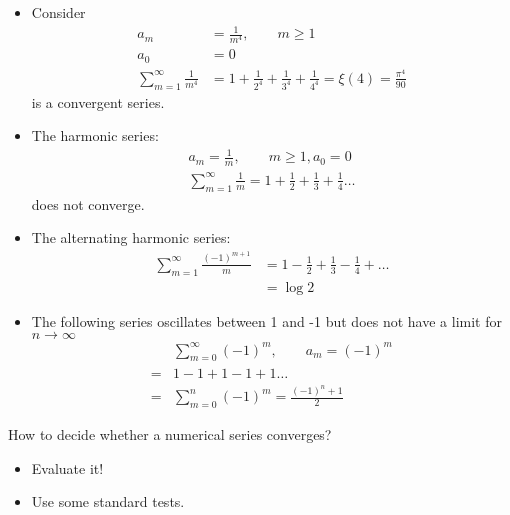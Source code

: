 \begin{ex}
	\begin{itemize}
		\item
		Consider
		\begin{align*}
		a_m & = \frac 1 {m^4}, \qquad m \ge 1 \\
		a_0 & = 0 \\
		\sum_{m=1}^\infty \frac 1 {m^4} & = 1 + \frac 1 {2^4} + \frac 1 {3^4} + \frac 1 {4^4} = \xi(4) = \frac{\pi^4}{90}
		\end{align*}
		is a convergent series.
		\item The harmonic series:
		\begin{align*}
		a_m = \frac 1 m, \qquad m \ge 1, a_0 = 0 \\
		\sum_{m=1}^\infty \frac 1 m = 1 + \frac 1 2 + \frac 1 3 + \frac 1 4 \dots
		\end{align*}
		does not converge. 
		\item The alternating harmonic series:
		\begin{align*}
		\sum_{m=1}^\infty \frac{(-1)^{m+1}}{m} & = 1 - \frac 1 2 + \frac 1 3 - \frac 1 4 + \dots \\
		& = \log 2
		\end{align*}
		\item
		The following series oscillates between 1 and -1 but does not have a limit for $n \to \infty$
		\begin{align*} 
		& \sum_{m=0}^\infty (-1)^m, \qquad a_m = (-1)^m \\
		= & 1 -1 +1 -1 +1 \dots \\
		= & \sum_{m=0}^n (-1)^m = \frac{(-1)^n+1}{2} 
		\end{align*}
	\end{itemize}
\end{ex}

How to decide whether a numerical series converges?
\begin{itemize}
	\item
	Evaluate it! 
	\item
	Use some standard tests.
\end{itemize}

